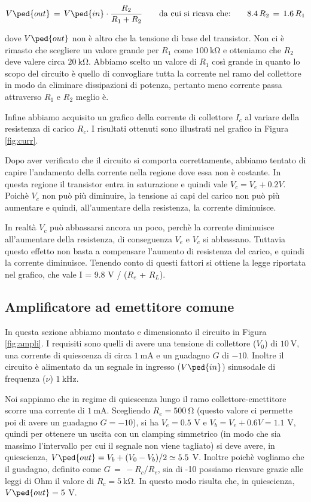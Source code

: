 \begin{equation}
	V\ped{out} \,=\, V\ped{in}\cdot\frac{R_2}{R_1+R_2} \qquad\text{da cui si ricava che:}\qquad 8.4\,R_2\,=\,1.6\,R_1
\end{equation}

dove $V\ped{out}$ non è altro che la tensione di base del transistor.
Non ci è rimasto che scegliere un valore grande per $R_1$ come $\SI{100}{\kilo\ohm}$ e otteniamo che $R_2$ deve valere circa $\SI{20}{\kilo\ohm}$. Abbiamo scelto un valore di $R_1$ così grande in quanto lo scopo del circuito è quello di convogliare tutta la corrente nel ramo del collettore in modo da eliminare dissipazioni di potenza, pertanto meno corrente passa attraverso $R_1$ e $R_2$ meglio è.

Infine abbiamo acquisito un grafico della corrente di collettore $I_c$ al variare della resistenza di carico $R_c$. I risultati ottenuti sono illustrati nel grafico in Figura \ref{fig:curr}.

Dopo aver verificato che il circuito si comporta correttamente, abbiamo tentato di capire l'andamento
della corrente nella regione dove essa non è costante. In questa regione il transistor entra in saturazione
e quindi vale $V_c = V_e + 0.2 V$. Poichè $V_c$ non può più diminuire, la tensione ai capi del carico non può più
aumentare e quindi, all'aumentare della resistenza, la corrente diminuisce.

In realtà $V_c$ può abbassarsi ancora un poco, perchè la corrente diminuisce all'aumentare della resistenza,
di conseguenza $V_e$ e $V_c$ si abbassano. Tuttavia questo effetto non basta a compensare l'aumento di
resistenza del carico, e quindi la corrente diminuisce. Tenendo conto di questi fattori si ottiene la legge
riportata nel grafico, che vale I = 9.8 V / ($R_e$ + $R_L$).

\subsection*{Amplificatore ad emettitore comune}

In questa sezione abbiamo montato e dimensionato il circuito in Figura \ref{fig:ampli}. I requisiti sono quelli di avere una tensione di collettore ($V_0$) di $\SI{10}{\volt}$, una corrente di quiescenza di circa $\SI{1}{\milli\ampere}$ e un guadagno $G$ di $-10$. Inoltre il circuito è alimentato da un segnale in ingresso ($V\ped{in}$) sinusodale di frequenza ($\nu$) $\SI{1}{\kilo\hertz}$.

Noi sappiamo che in regime di quiescenza lungo il ramo collettore-emettitore scorre una corrente di $\SI{1}{\milli\ampere}$. Scegliendo $R_e = \SI{500}{\ohm}$ (questo valore ci permette poi di avere un guadagno $G = -10$), si ha $V_e = 0.5$ V e $V_b = V_e + 0.6 V  = 1.1$ V, quindi per ottenere un uscita con un clamping simmetrico (in modo che sia massimo l'intervallo per cui il segnale non viene tagliato) si deve avere, in quiescienza, $V\ped{out} = V_b + (V_0 - V_b)/2 \simeq 5.5$ V.
Inoltre poichè vogliamo che il guadagno, definito come $G\,=\,-R_c/R_e$, sia di -10 possiamo ricavare grazie alle leggi di Ohm il valore di $R_c = \SI{5}{\kilo\ohm}$. In questo modo risulta che, in quiescienza, $V\ped{out} = 5$ V.

